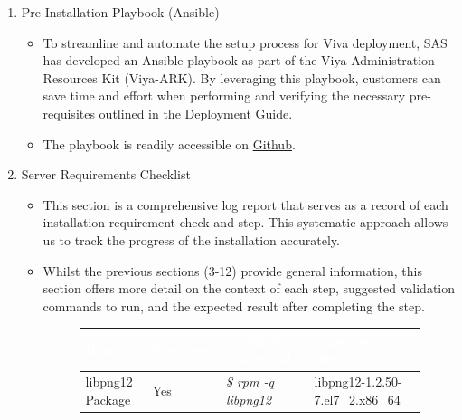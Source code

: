 \begin{enumerate}
\begin{itemize}
    \end{itemize}
    \item Pre-Installation Playbook (Ansible)
    \begin{itemize}
        \item To streamline and automate the setup process for Viva deployment, SAS has developed an Ansible playbook as part of the Viya Administration Resources Kit (Viya-ARK). By leveraging this playbook, customers can save time and effort when performing and verifying the necessary pre-requisites outlined in the Deployment Guide.
        \item The playbook is readily accessible on \href{https://github.com/sassoftware/viya-ark}{Github}. 
    \end{itemize}
    \item Server Requirements Checklist
    \begin{itemize}
        \item This section is a comprehensive log report that serves as a record of each installation requirement check and step. This systematic approach allows us to track the progress of the installation accurately. 
        \item Whilst the previous sections (3-12) provide general information, this section offers more detail on the context of each step, suggested validation commands to run, and the expected result after completing the step.
            \begin{figure}[H]
            \begin{center}
            \renewcommand{\arraystretch}{1.5}
            \begin{tabular}{|>{\raggedright\arraybackslash}l
                            |>{\raggedright\arraybackslash}l
                            |>{\raggedright\arraybackslash}l
                            |>{\raggedright\arraybackslash}l
                            |}
            \hline
            \rowcolor[HTML]{196fb4}\centering\textcolor{white}{\large Item} 
                                    & \centering\textcolor{white}{\large Reviewed}
                                    & \centering\textcolor{white}{\large Validation Command}
                                    & \centering\textcolor{white}{\large Expected Result}
                                    \tabularnewline 
            \hline
            libpng12 Package & Yes & \emph{\$ rpm -q libpng12} & libpng12-1.2.50-7.el7\_2.x86\_64 \\\hline

\end{tabular}
\end{center}
\end{figure}
\end{itemize}
\end{enumerate}
